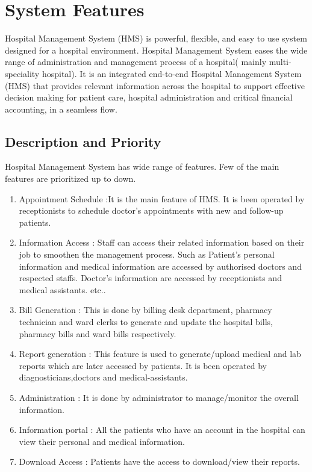 \documentclass{scrreprt}
\begin{document}
\chapter{System Features}

Hospital Management System (HMS) is powerful, flexible, and easy to use system designed for a hospital environment. Hospital Management System
eases the wide range of administration and management process of a hospital( mainly multi-speciality hospital). It is an
integrated end-to-end Hospital Management System (HMS) that provides relevant
information across the hospital to support effective decision making for patient
care, hospital administration and critical financial accounting, in a seamless flow.

\section{Description and Priority}
Hospital Management System has wide range of features. Few of the main features are prioritized up to down.
 
\begin{enumerate}
    \item Appointment Schedule :It is the main feature of HMS. It is been operated by receptionists to schedule doctor's appointments with new and follow-up patients.
     \item Information Access :  Staff can access their related information based on their job to smoothen the management process. Such as  Patient's personal information and medical information are accessed by authorised doctors and respected staffs. Doctor's information are accessed by receptionists and medical assistants. etc..
    \item Bill Generation : This is done by billing desk department, pharmacy technician and ward clerks to generate and update the hospital bills, pharmacy bills and ward bills respectively.
    \item Report generation : This feature is used to generate/upload medical and lab reports which are later accessed by patients. It is been operated by diagnosticians,doctors and medical-assistants.
    \item Administration : It is done by administrator to manage/monitor the overall information.
    \item Information portal : All the patients who have an account in the hospital can view their personal and medical information.
    \item Download Access : Patients have the access to download/view their reports.
\end{enumerate}
\end{document}
